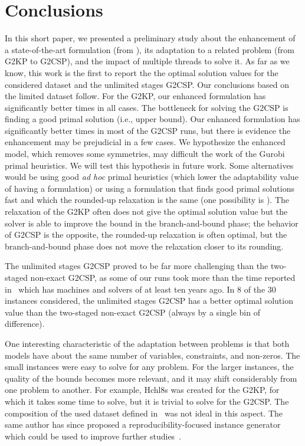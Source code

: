 \documentclass[9pt]{entcs}
\begin{document}
\section{Conclusions}

In this short paper, we presented a preliminary study about the enhancement of a state-of-the-art formulation (from \cite{furini:2016}), its adaptation to a related problem (from G2KP to G2CSP), and the impact of multiple threads to solve it.
As far as we know, this work is the first to report the the optimal solution values for the considered dataset and the unlimited stages G2CSP.
Our conclusions based on the limited dataset follow.
For the G2KP, our enhanced formulation has significantly better times in all cases.
The bottleneck for solving the G2CSP is finding a good primal solution (i.e., upper bound).
Our enhanced formulation has significantly better times in most of the G2CSP runs, but there is evidence the enhancement may be prejudicial in a few cases.
We hypothesize the enhanced model, which removes some symmetries, may difficult the work of the Gurobi primal heuristics.
We will test this hypothesis in future work.
Some alternatives would be using good \emph{ad hoc} primal heuristics (which lower the adaptability value of having a formulation) or using a formulation that finds good primal solutions fast and which the rounded-up relaxation is the same (one possibility is \cite{martin:2020:top}).
The relaxation of the G2KP often does not give the optimal solution value but the solver is able to improve the bound in the branch-and-bound phase; the behavior of G2CSP is the opposite, the rounded-up relaxation is often optimal, but the branch-and-bound phase does not move the relaxation closer to its rounding.

The unlimited stages G2CSP proved to be far more challenging than the two-staged non-exact G2CSP, as some of our runs took more than the time reported in~\cite{silva:2010} which has machines and solvers of at least ten years ago.
In 8 of the 30 instances considered, the unlimited stages G2CSP has a better optimal solution value than the two-staged non-exact G2CSP (always by a single bin of difference).

One interesting characteristic of the adaptation between problems is that both models have about the same number of variables, constraints, and non-zeros.
The small instances were easy to solve for any problem.
For the larger instances, the quality of the bounds becomes more relevant, and it may shift considerably from one problem to another.
For example, Hchl8s was created for the G2KP, for which it takes some time to solve, but it is trivial to solve for the G2CSP.
The composition of the used dataset defined in~\cite{silva:2010} was not ideal in this aspect.
The same author has since proposed a reproducibility-focused instance generator which could be used to improve further studies~\cite{silva:2014}.
\end{document}
